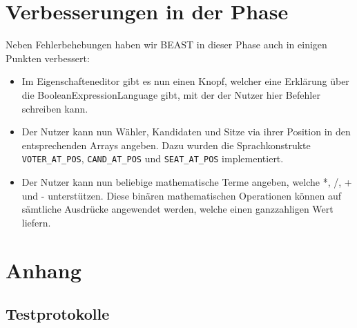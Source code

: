 \documentclass[a4paper]{scrreprt}
\begin{document}
\chapter{Verbesserungen in der Phase}
Neben Fehlerbehebungen haben wir BEAST in dieser Phase auch in einigen Punkten
verbessert:

\begin{itemize}
  \item Im Eigenschafteneditor gibt es nun einen Knopf, welcher eine Erklärung
  über die BooleanExpressionLanguage gibt, mit der der Nutzer hier Befehler
  schreiben kann.
  \item Der Nutzer kann nun Wähler, Kandidaten und Sitze via ihrer Position in den entsprechenden Arrays angeben. Dazu wurden die Sprachkonstrukte \verb!VOTER_AT_POS!, \verb!CAND_AT_POS! und \verb!SEAT_AT_POS! implementiert.
  \item Der Nutzer kann nun beliebige mathematische Terme angeben, welche *, /, + und - unterstützen. Diese binären mathematischen Operationen können auf sämtliche Ausdrücke angewendet werden, welche einen ganzzahligen Wert liefern.
\end{itemize}

\chapter{Anhang}

\section{Testprotokolle}









\end{document}
